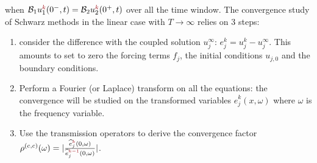 when ${\mathcal B}_1 u_1^{\emphase{k}}(0^-,t) = {\mathcal B}_2 u_2^{{\emphase{k}}}(0^+,t)$
over all the time window. The convergence study of Schwarz methods
in the linear case with $T\rightarrow \infty$ relies on 3 steps:
\begin{enumerate}
	\item consider the difference with the coupled solution
		$u^\infty_j$:
		$e^k_j = u^k_j - u^\infty_j$. This amounts to
		set to zero the forcing terms $f_j$,
		the initial conditions $u_{j,0}$ and
		the boundary conditions.
	\item Perform a Fourier (or Laplace) transform on all the
		equations: the convergence will be studied on
		the transformed variables
		$\widehat{e}^k_j(x,\omega)$ where $\omega$ is
		the frequency variable.
	\item Use the transmission operators to derive the
		convergence factor $\rho^{(c, c)}(\omega) =
		|\frac{\widehat{e}^{\emphase{k}}_j(0,\omega)}
		{\widehat{e}^{\emphase{k-1}}_j(0,\omega)}|$.
\end{enumerate}
